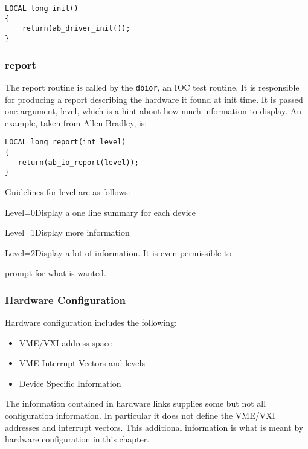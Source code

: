 \begin{verbatim}LOCAL long init()
{
    return(ab_driver_init());
}
\end{verbatim}\subsubsection{report}

The report routine is called by the \verb|dbior|, an IOC test routine. It is responsible for producing a report describing the 
hardware it found at init time. It is passed one argument, level, which is a hint about how much information to display. An 
example, taken from Allen Bradley, is:

\begin{verbatim}LOCAL long report(int level)
{
   return(ab_io_report(level));
}
\end{verbatim}Guidelines for level are as follows:

\begin{description}\item Level=0Display a one line summary for each device

\item Level=1Display more information

\item Level=2Display a lot of information. It is even permissible to

\item prompt for what is wanted.

\end{description}\subsubsection{Hardware Configuration}

Hardware configuration includes the following:

\begin{itemize}\item VME/VXI address space

\item VME Interrupt Vectors and levels

\item Device Specific Information

\end{itemize}The information contained in hardware links supplies some but not all configuration information. In particular it does not 
define the VME/VXI addresses and interrupt vectors. This additional information is what is meant by hardware 
configuration in this chapter.

